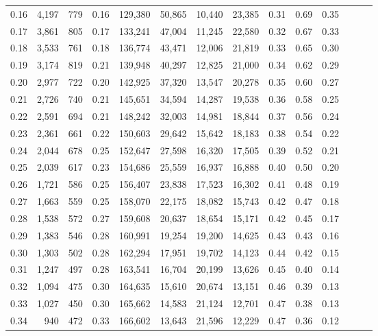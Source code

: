 \begin{tabular}{rrrrrrrrrrrrrr}
0.16 &   4,197 &  779 &  0.16 &  129,380 &   50,865 &  10,440 &  23,385 &  0.31 &  0.69 &      0.35 \\
0.17 &   3,861 &  805 &  0.17 &  133,241 &   47,004 &  11,245 &  22,580 &  0.32 &  0.67 &      0.33 \\
0.18 &   3,533 &  761 &  0.18 &  136,774 &   43,471 &  12,006 &  21,819 &  0.33 &  0.65 &      0.30 \\
0.19 &   3,174 &  819 &  0.21 &  139,948 &   40,297 &  12,825 &  21,000 &  0.34 &  0.62 &      0.29 \\
0.20 &   2,977 &  722 &  0.20 &  142,925 &   37,320 &  13,547 &  20,278 &  0.35 &  0.60 &      0.27 \\
0.21 &   2,726 &  740 &  0.21 &  145,651 &   34,594 &  14,287 &  19,538 &  0.36 &  0.58 &      0.25 \\
0.22 &   2,591 &  694 &  0.21 &  148,242 &   32,003 &  14,981 &  18,844 &  0.37 &  0.56 &      0.24 \\
0.23 &   2,361 &  661 &  0.22 &  150,603 &   29,642 &  15,642 &  18,183 &  0.38 &  0.54 &      0.22 \\
0.24 &   2,044 &  678 &  0.25 &  152,647 &   27,598 &  16,320 &  17,505 &  0.39 &  0.52 &      0.21 \\
0.25 &   2,039 &  617 &  0.23 &  154,686 &   25,559 &  16,937 &  16,888 &  0.40 &  0.50 &      0.20 \\
0.26 &   1,721 &  586 &  0.25 &  156,407 &   23,838 &  17,523 &  16,302 &  0.41 &  0.48 &      0.19 \\
0.27 &   1,663 &  559 &  0.25 &  158,070 &   22,175 &  18,082 &  15,743 &  0.42 &  0.47 &      0.18 \\
0.28 &   1,538 &  572 &  0.27 &  159,608 &   20,637 &  18,654 &  15,171 &  0.42 &  0.45 &      0.17 \\
0.29 &   1,383 &  546 &  0.28 &  160,991 &   19,254 &  19,200 &  14,625 &  0.43 &  0.43 &      0.16 \\
0.30 &   1,303 &  502 &  0.28 &  162,294 &   17,951 &  19,702 &  14,123 &  0.44 &  0.42 &      0.15 \\
0.31 &   1,247 &  497 &  0.28 &  163,541 &   16,704 &  20,199 &  13,626 &  0.45 &  0.40 &      0.14 \\
0.32 &   1,094 &  475 &  0.30 &  164,635 &   15,610 &  20,674 &  13,151 &  0.46 &  0.39 &      0.13 \\
0.33 &   1,027 &  450 &  0.30 &  165,662 &   14,583 &  21,124 &  12,701 &  0.47 &  0.38 &      0.13 \\
0.34 &     940 &  472 &  0.33 &  166,602 &   13,643 &  21,596 &  12,229 &  0.47 &  0.36 &      0.12 \\

\end{tabular}
